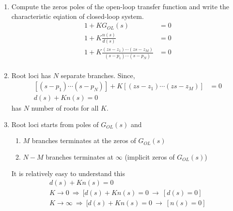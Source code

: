 \documentclass[twoside]{article}
\begin{document}
\begin{enumerate} 

\item Compute the zeros poles of the open-loop 
transfer function and write the characteristic eqiation
of closed-loop system.
%
\begin{align*}
1 + K G_{OL}(s)  &= 0 \\
1 + K \frac{n(s)}{d(s)} &= 0 \\
1 + K \frac{(zs- z_1) \cdots (zs- z_M)}{(s - p_1) \cdots (s - p_N)} &= 0 \\
\end{align*}
%

\item Root loci has $N$ separate branches. Since,
%
\begin{align*}
\left[ (s - p_1) \cdots (s - p_N) \right] + K \left[ (zs- z_1) \cdots (zs- z_M) \right]  &= 0 \\
d(s) + K n(s) = 0
\end{align*}
%
has $N$ number of roots for all $K$.

\item Root loci starts from poles of $G_{OL}(s)$ and 
%
\begin{enumerate} 
   \item $M$ branches terminates at the zeros of $G_{OL}(s)$
   \item $N-M$ branches terminates at $\infty$ (implicit zeros of $G_{OL}(s)$)
\end{enumerate}

It is relatively easy to understand this 
%
\begin{align*}
d(s) + K n(s) = 0 
\\
K \to 0 \ \Rightarrow \ [d(s) + K n(s) = 0 \ \to \ [d(s) = 0]
\\
K \to \infty \ \Rightarrow \ [d(s) + K n(s) = 0 \ \to  \ [n(s) = 0]
\end{align*}


\end{enumerate}
\end{document}
